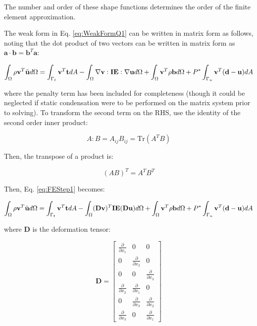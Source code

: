 \documentclass[10pt]{article}
\begin{document}
The number and order of these shape functions determines the order of the finite element approximation. 

The weak form in Eq. \eqref{eq:WeakFormQ1} can be written in matrix form as follows, noting that the dot product of two vectors can be written in matrix form as \(\textbf{a}\cdot\textbf{b}=\textbf{b}^T\textbf{a}\):

\begin{equation}
\label{eq:FEStep1}
\int_{\Omega}\rho\textbf{v}^T\ddot{\textbf{u}}d\Omega=\int_{\Gamma_t}\textbf{v}^T\textbf{t}dA- \int_{\Omega}\nabla\textbf{v}:\textbf{IE}:\nabla\textbf{u}d\Omega +\int_{\Omega}\textbf{v}^T\rho\textbf{b}d\Omega+P^{*}\int_{\Gamma_u}\textbf{v}^T(\textbf{d}-\textbf{u})dA\\
\end{equation}

where the penalty term has been included for completeness (though it could be neglected if static condensation were to be performed on the matrix system prior to solving). To transform the second term on the RHS, use the identity of the second order inner product:

\begin{equation}
A:B=A_{ij}B_{ij}=\text{Tr}(A^TB)
\end{equation}

Then, the transpose of a product is:

\begin{equation}
(AB)^T=A^TB^T
\end{equation}


Then, Eq. \eqref{eq:FEStep1} becomes:

\begin{equation}
\int_{\Omega}\rho\textbf{v}^T\ddot{\textbf{u}}d\Omega=\int_{\Gamma_t}\textbf{v}^T\textbf{t}dA- \int_{\Omega}(\textbf{D}\textbf{v})^T\textbf{IE}(\textbf{D}\textbf{u})d\Omega +\int_{\Omega}\textbf{v}^T\rho\textbf{b}d\Omega+P^{*}\int_{\Gamma_u}\textbf{v}^T(\textbf{d}-\textbf{u})dA\\
\end{equation}

where \(\textbf{D}\) is the deformation tensor:

\begin{equation}
\label{eq:D}
\textbf{D}=\begin{bmatrix}\frac{\partial}{\partial x_1} & 0 & 0\\
0 & \frac{\partial}{\partial x_2} & 0\\
0 & 0 & \frac{\partial}{\partial x_3}\\
\frac{\partial}{\partial x_2} & \frac{\partial}{\partial x_1} & 0\\
0 & \frac{\partial}{\partial x_3} & \frac{\partial}{\partial x_2}\\
\frac{\partial}{\partial x_3} & 0 & \frac{\partial}{\partial x_1}\end{bmatrix}
\end{equation}
\end{document}
